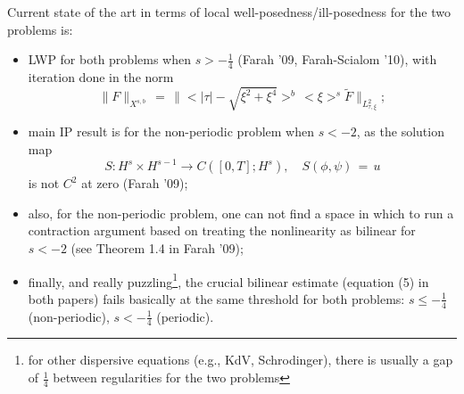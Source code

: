 \documentclass[12pt,reqno]{amsart}
\numberwithin{equation}{section}  %
\numberwithin{figure}{section}
\theoremstyle{plain}
\theoremstyle{definition}
\theoremstyle{remark}
\begin{document}
Current state of the art in terms of local well-posedness/ill-posedness for the two problems is:
\begin{itemize}
  \item LWP for both problems when $s>-\frac 14$ (Farah '09, Farah-Scialom '10), with iteration done in
    the norm
    \[
    \|F\|_{X^{s,b}}\,=\,\|<|\tau|-\sqrt{\xi^2+\xi^4}>^b\,<\xi>^s \tilde{F}\|_{L^2_{\tau,\xi}};
    \]

  \item main IP result is for the non-periodic problem when $s<-2$, as the solution map 
    \[
    S: H^s\times H^{s-1} \to C([0,T]; H^s), \quad
    S(\phi,\psi)\,=\,u
    \]
    is not $C^2$ at zero (Farah '09);

  \item also, for the non-periodic problem, one can not find a space in which to run a contraction argument based on treating the nonlinearity as bilinear for $s<-2$ (see Theorem 1.4 in Farah '09);

  \item finally, and really puzzling\footnote{for other dispersive equations (e.g., KdV, Schrodinger), there is usually a gap of $\frac 14$ between regularities for the two problems}, the crucial bilinear estimate (equation (5) in both papers) fails basically at the same threshold for both problems: $s\leq -\frac 14$ (non-periodic), $s<-\frac{1}{4}$ (periodic).
\end{itemize}
\end{document}

